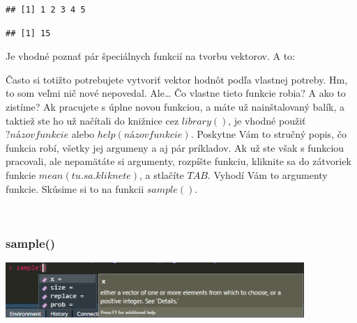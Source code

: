 \begin{Shaded}
\begin{Highlighting}[]
\end{Highlighting}
\end{Shaded}

\begin{verbatim}
## [1] 1 2 3 4 5
\end{verbatim}

\begin{Shaded}
\begin{Highlighting}[]
\end{Highlighting}
\end{Shaded}

\begin{verbatim}
## [1] 15
\end{verbatim}

Je vhodné poznať pár špeciálnych funkcií na tvorbu vektorov. A to:

\begin{Shaded}
\begin{Highlighting}[]
\end{Highlighting}
\end{Shaded}

Často si totižto potrebujete vytvoriť vektor hodnôt podľa vlastnej
potreby. Hm, to som veľmi nič nové nepovedal. Ale\ldots{} Čo vlastne
tieto funkcie robia? A ako to zistíme? Ak pracujete s úplne novou
funkciou, a máte už nainštalovaný balík, a taktiež ste ho už načítali do
knižnice cez \(library()\), je vhodné použiť \(?názovfunkcie\) alebo
\(help(názovfunkcie)\). Poskytne Vám to stručný popis, čo funkcia robí,
všetky jej argumeny a aj pár príkladov. Ak už ste však s funkciou
pracovali, ale nepamätáte si argumenty, rozpíšte funkciu, kliknite sa do
zátvoriek funkcie \(mean(tu.sa.kliknete)\), a stlačíte \(TAB\). Vyhodí
Vám to argumenty funkcie. Skúsime si to na funkcii \(sample()\).

~

\hypertarget{sample}{%
\subsubsection{sample()}\label{sample}}

\begin{center}

\includegraphics[width=0.85\textwidth,height=\textheight]{diplomka obrazky/2.png}

\end{center}

